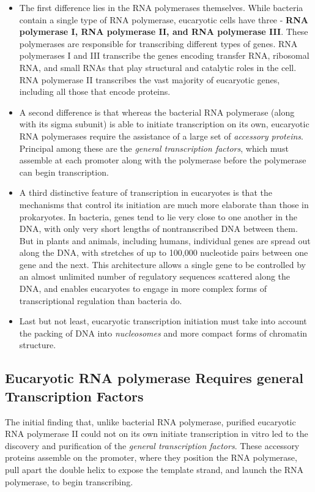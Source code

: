 \begin{itemize}
\item The first difference lies in the RNA polymerases themselves. While
bacteria contain a single type of RNA polymerase, eucaryotic
cells have three - \textbf{RNA polymerase I, RNA polymerase II, and RNA
polymerase III}. These polymerases are responsible for transcribing
different types of genes. RNA polymerases I and III transcribe
the genes encoding transfer RNA, ribosomal RNA, and small RNAs
that play structural and catalytic roles in the cell.
RNA polymerase II transcribes the vast majority of eucaryotic genes,
including all those that encode proteins.
\item A second difference is that whereas the bacterial RNA polymerase
(along with its sigma subunit) is able to initiate transcription
on its own, eucaryotic RNA polymerases require the assistance of
a large set of \textit{accessory proteins}. Principal among these are the
\textit{general transcription factors}, which must assemble at each promoter
along with the polymerase before the polymerase can begin
transcription.
\item A third distinctive feature of transcription in eucaryotes is that
the mechanisms that control its initiation are much more elaborate
than those in prokaryotes. In bacteria, genes tend to lie very close to one another
in the DNA, with only very short lengths of nontranscribed DNA
between them. But in plants and animals, including humans, individual
genes are spread out along the DNA, with stretches of up
to 100,000 nucleotide pairs between one gene and the next. This
architecture allows a single gene to be controlled by an almost
unlimited number of regulatory sequences scattered along the
DNA, and enables eucaryotes to engage in more complex forms of
transcriptional regulation than bacteria do.
\item Last but not least, eucaryotic transcription initiation must take into
account the packing of DNA into \textit{nucleosomes} and more compact
forms of chromatin structure.
\end{itemize}

\subsection{Eucaryotic RNA polymerase Requires general Transcription Factors}

The initial finding that, unlike bacterial RNA polymerase, purified eucaryotic
RNA polymerase II could not on its own initiate transcription in vitro
led to the discovery and purification of the \textit{general transcription factors}.
These accessory proteins assemble on the promoter, where they position
the RNA polymerase, pull apart the double helix to expose the template
strand, and launch the RNA polymerase, to begin transcribing.

